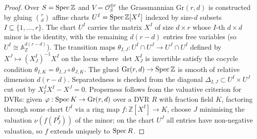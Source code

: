 \begin{proof}\leanok
  Over \(S = \operatorname{Spec} \mathbb{Z}\) and \(V = \mathcal{O}_S^{\oplus r}\) the
  Grassmannian \(\mathrm{Gr}(r, d)\) is constructed by gluing
  \(\binom{r}{d}\) affine charts \(U^I = \operatorname{Spec}\mathbb{Z}[X^I]\) indexed by
  size-\(d\) subsets \(I \subseteq \{1, \dots, r\}\). The chart \(U^I\)
  carries the matrix \(X^I\) of size \(d \times r\) whose \(I\)-th \(d \times d\)
  minor is the identity, with the remaining \(d(r-d)\) entries free
  variables (so \(U^I \cong \mathbb{A}^{d(r-d)}_{\mathbb{Z}}\)). The
  transition maps \(\theta_{I,J} : U^I \cap U^J \to U^J \cap U^I\) defined
  by \(X^J \mapsto (X^I_J)^{-1} X^I\) on the locus where \(\det X^I_J\) is
  invertible satisfy the cocycle condition
  \(\theta_{I,K} = \theta_{I,J} \circ \theta_{J,K}\). The glued
  \(\mathrm{Gr}(r,d) \to \operatorname{Spec}\mathbb{Z}\) is smooth of relative dimension
  \(d(r-d)\). Separatedness is checked from the diagonal
  \(\Delta_{I,J} \subset U^I \times U^J\) cut out by \(X^J_I X^I - X^J = 0\).
  Properness follows from the valuative criterion for DVRs: given
  \(\varphi : \operatorname{Spec} K \to \mathrm{Gr}(r,d)\) over a DVR \(R\) with fraction
  field \(K\), factoring through some chart \(U^I\) via a ring map
  \(f : \mathbb{Z}[X^I] \to K\), choose \(J\) minimising the valuation
  \(\nu(f(P^I_J))\) of the minor; on the chart \(U^J\) all entries have
  non-negative valuation, so \(f\) extends uniquely to \(\operatorname{Spec} R\).


\end{proof}
